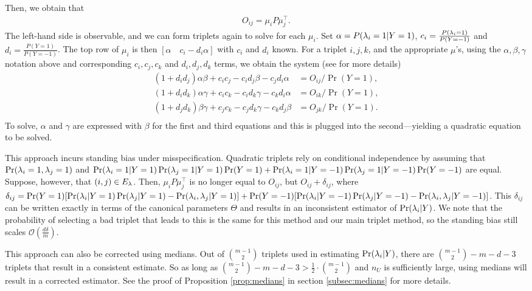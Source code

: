 Then, we obtain that 
\begin{align}
O_{ij} = \mu_i P \mu_j^\top.
\label{eq:newparam}
\end{align}
The left-hand side is observable, and we can form triplets again to solve for each $\mu_i$. 
Set $\alpha = P(\lambda_i =1 |Y=1)$, $c_i = \frac{P(\lambda_i = 1)}{P(Y=-1)} $ and $d_i = \frac{P(Y=1)}{P(Y=-1)}$. The top row of $\mu_i$ is then $[\alpha \quad c_i - d_i \alpha]$ with $c_i$ and $d_i$ known. For a triplet $i,j,k$, and the appropriate $\mu$'s, using the $\alpha, \beta, \gamma$ notation above and corresponding $c_i, c_j, c_k$ and $d_i, d_j, d_k$ terms, we obtain the system (see \cite{fu2020fast} for more details)
\begin{align*}
(1+d_i d_j) \alpha \beta + c_i c_j - c_i d_j \beta - c_j d_i \alpha &= O_{ij}/\Pr(Y=1), \\
(1+d_i d_k)\alpha \gamma + c_i c_k - c_i d_k \gamma - c_k d_i\alpha &= O_{ik}/\Pr(Y=1), \\
(1+d_j d_k)\beta \gamma + c_j c_k - c_j d_k \gamma - c_k d_j \beta &= O_{jk}/\Pr(Y=1). \\
\end{align*}
To solve, $\alpha$ and $\gamma$ are expressed with $\beta$ for the first and third equations and this is plugged into the second---yielding a quadratic equation to be solved.

This approach incurs standing bias under misspecification. Quadratic triplets rely on conditional independence by assuming that $\Pr(\lambda_i = 1, \lambda_j = 1)$ and $\Pr(\lambda_i = 1 | Y = 1) \Pr(\lambda_j = 1 | Y = 1) \Pr(Y = 1) + \Pr(\lambda_i = 1 | Y = -1) \Pr(\lambda_j = 1 | Y = -1) \Pr(Y = -1)$ are equal. Suppose, however, that $(i, j) \in E_{\lambda}$. Then, $\mu_i P \mu_j^\top$ is no longer equal to $O_{ij}$, but $O_{ij} + \delta_{ij}$, where $\delta_{ij} = \Pr(Y = 1)[\Pr(\lambda_i | Y = 1) \Pr(\lambda_j | Y = 1) - \Pr(\lambda_i, \lambda_j | Y = 1)] + \Pr(Y = -1)[\Pr(\lambda_i | Y = -1) \Pr(\lambda_j | Y = -1) - \Pr(\lambda_i, \lambda_j | Y = -1)]$. This $\delta_{ij}$ can be written exactly in terms of the canonical parameters $\Theta$ and results in an inconsistent estimator of $\Pr(\lambda_i | Y)$. We note that the probability of selecting a bad triplet that leads to this is the same for this method and our main triplet method, so the standing bias still scales $\mathcal{O}(\frac{d \delta}{m})$.

This approach can also be corrected using medians. Out of ${m - 1 \choose 2}$ triplets used in estimating $\Pr(\lambda_i | Y)$, there are ${m - 1 \choose 2 } - m - d - 3$ triplets that result in a consistent estimate. So as long as ${m - 1 \choose 2} - m - d - 3 > \frac{1}{2} \cdot {m - 1 \choose 2}$ and $n_U$ is sufficiently large, using medians will result in a corrected estimator. See the proof of Proposition \ref{prop:medians} in section \ref{subsec:medians} for more details. 

